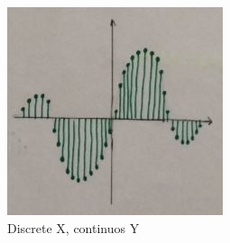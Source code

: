 \begin{description}
		\begin{figure}[!h]
			\centering
			\includegraphics[width=0.7\linewidth]{images_LA/DiscreteX_continuosY}
			\caption{Discrete X, continuos Y}
			\label{fig:DiscreteX_continuosY}
		\end{figure}
		

\end{description}
